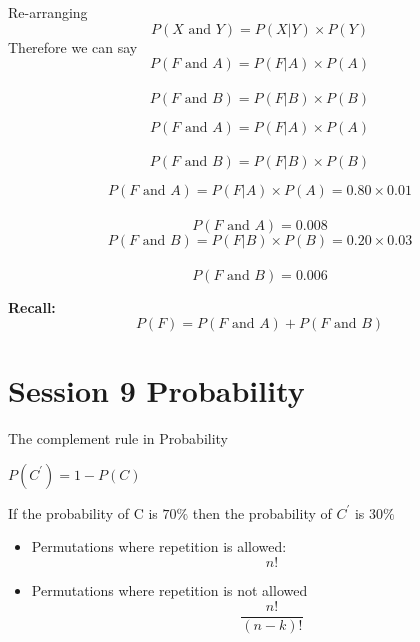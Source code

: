 \documentclass[12pt]{report}
\begin{document}
		Re-arranging
		\[ P(X \mbox{ and } Y) =  P(X|Y)\times P(Y) \]
		Therefore we can say
		\[ P(F \mbox{ and } A) =  P(F|A)\times P(A) \]\\
		\[ P(F \mbox{ and } B) =  P(F|B)\times P(B) \]
		
		
		
		\Large
		\vspace{-1.5cm}
		\[ P(F \mbox{ and } A) =  P(F|A)\times P(A) \]\\
		\vspace{1.7cm}
		\[ P(F \mbox{ and } B) =  P(F|B)\times P(B) \]
		
		
		
		\Large
		\[ P(F \mbox{ and } A) =  P(F|A)\times P(A) = 0.80 \times 0.01\]\\
		\[ P(F \mbox{ and } A) = 0.008\]
		\bigskip
		\[ P(F \mbox{ and } B) =  P(F|B)\times P(B) = 0.20 \times 0.03\]\\
		\[ P(F \mbox{ and } B) = 0.006\]
		
		\textbf{Recall:}
		\[ P(F) = P(F \mbox{ and } A) + P(F \mbox{ and } B) \]
		
		
		
		\newpage
		\section*{Session 9 Probability}

		
		
		The complement rule in Probability
		
		$P(C^{\prime}) = 1- P(C)$
		
		
		
		If the probability of C is $70 \%$ then the probability of $C^{\prime}$ is $30\%$
		
		
		\newpage


\large
\begin{itemize}
	\item Permutations where repetition is allowed: 
	\[ n! \]
	\item Permutations where repetition is not allowed
	\[ \frac{n!}{(n-k)!} \]
	\end{itemize}
	
	
	
\end{document}
